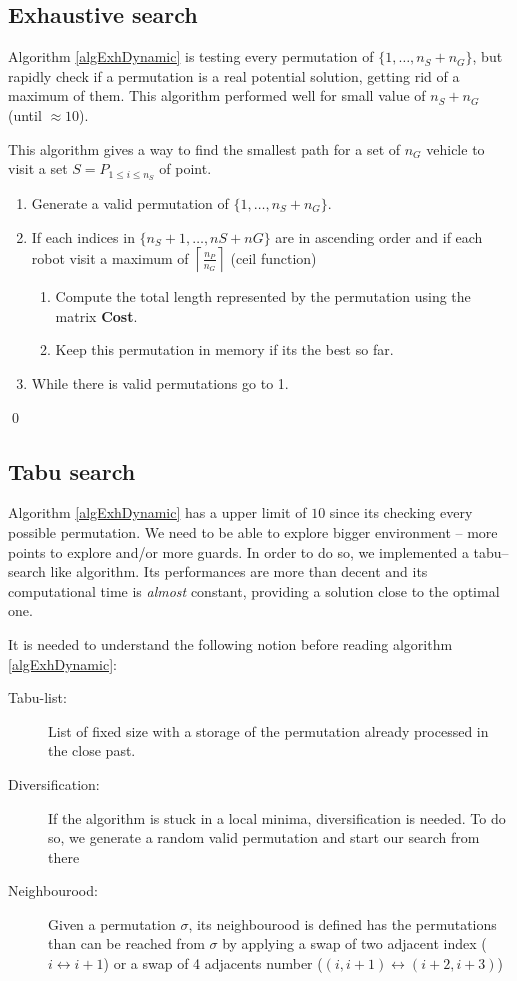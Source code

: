 \subsection{Exhaustive search}

Algorithm \ref{algExhDynamic} is testing every permutation of $\{1,\hdots,n_{S}+n_{G}\}$, but rapidly check if a permutation is a real potential solution, getting rid of a maximum of them. This algorithm performed well for small value of $n_S + n_G$ (until $\approx 10$).

\begin{algorithm}
This algorithm gives a way to find the smallest path for a set of $n_{G}$ vehicle to visit a set $S = P_{1\leq i \leq n_S}$ of point.
\begin{enumerate}
  \item Generate a valid permutation of $\{1,\hdots,n_{S}+n_{G}\}$.
  \item If each indices in $\{n_S +1, \hdots , nS +nG\}$ are in ascending order and if each robot visit a maximum of $\left \lceil{\frac{n_P}{n_G}}\right \rceil$ (ceil function)
  \begin{enumerate}
  \item Compute the total length represented by the permutation using the matrix \textbf{Cost}.
  \item Keep this permutation in memory if its the best so far.
  \end{enumerate}
\item While there is valid permutations go to 1.
\end{enumerate}
\qed
\label{algExhDynamic}
\end{algorithm}


\subsection{Tabu search}

Algorithm \ref{algExhDynamic} has a upper limit of $10$ since its checking every possible permutation. We need to be able to explore bigger environment -- more points to explore and/or more guards. In order to do so, we implemented a tabu--search like algorithm. Its performances are more than decent and its computational time is \emph{almost} constant, providing a solution close to the optimal one.

It is needed to understand the following notion before reading algorithm \ref{algExhDynamic}:
\begin{description}
 \item[Tabu-list:] List of fixed size with a storage of the permutation already processed in the close past.
 \item[Diversification:] If the algorithm is stuck in a local minima, diversification is needed. To do so, we generate a random valid permutation and start our search from there
 \item[Neighbourood:] Given a permutation $\sigma$, its neighbourood is defined has the permutations than can be reached from $\sigma$ by applying a swap of two adjacent index ($i \leftrightarrow i+1$) or a swap of 4 adjacents number ($(i,i+1) \leftrightarrow (i+2,i+3)$)
\end{description}


